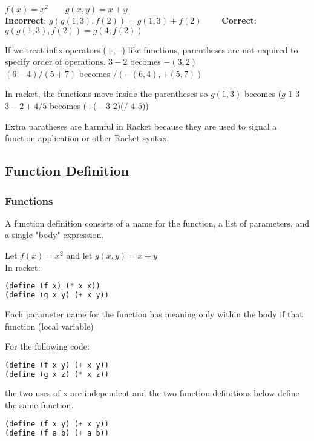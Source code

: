 \documentclass[english, 12pt]{article}
\begin{document}
\begin{exmp}
$f(x) = x^2\qquad g(x,y) = x + y$\\
\textbf{Incorrect}: $g(g(1,3),f(2)) = g(1,3) + f(2)\qquad$
\textbf{Correct}: $g(g(1,3),f(2)) =g(4,f(2))$
\end{exmp}

\begin{exmp}
If we treat infix operators ($+$,$-$) like functions, parentheses are not required to specify order of operations.
$ 3 - 2$ becomes $- (3,2)$\\
$(6-4)/(5+7) $ becomes $/(-(6,4), + (5,7)) $
\end{exmp}


\begin{exmp}
In racket, the functions move inside the parentheses so $g(1,3)$ becomes ($g$ $1$ $3$\\
$3 - 2 + 4/5 $ becomes ($+$($-$ $3$ $2$)($/$ $4$ $5$))
\end{exmp}

\begin{note}
Extra paratheses are harmful in Racket because they are used to signal a function application or other Racket syntax.
\end{note}
\subsection{Function Definition}
\subsubsection*{Functions}
A function definition consists of a name for the function, a list of parameters, and a single "body" expression.

\begin{exmp}
Let $f(x)=x^2$ and let $g(x,y) = x + y$\\
In racket:
\begin{lstlisting}[language=Scheme]
(define (f x) (* x x))
(define (g x y) (+ x y))
\end{lstlisting}
\end{exmp}

Each parameter name for the function has meaning only within the body if that function (local variable)
\begin{exmp}
For the following code:
\begin{lstlisting}[language=Scheme]
(define (f x y) (+ x y))
(define (g x z) (* x z))
\end{lstlisting}
the two uses of x are independent and the two function definitions below define the same function.
\begin{lstlisting}[language=Scheme]
(define (f x y) (+ x y))
(define (f a b) (+ a b))
\end{lstlisting}
\end{exmp}
\end{document}
